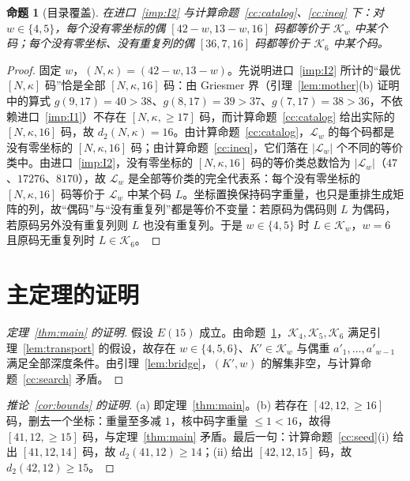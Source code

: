 \documentclass[11pt]{ctexart}
\newtheorem{proposition}{命题}
\theoremstyle{definition}
\begin{document}
\begin{proposition}[目录覆盖]\label{prop:cover}
在进口~\ref{imp:I2} 与计算命题~\ref{cc:catalog}、\ref{cc:ineq} 下：对 $w\in\{4,5\}$，每个没有零坐标的偶 $[42-w,13-w,16]$ 码都等价于 $\mathcal K_w$ 中某个码；每个没有零坐标、没有重复列的偶 $[36,7,16]$ 码都等价于 $\mathcal K_6$ 中某个码。
\end{proposition}
\begin{proof}
固定 $w$，$(N,\kappa)=(42-w,13-w)$。先说明进口~\ref{imp:I2} 所计的“最优 $[N,\kappa]$ 码”恰是全部 $[N,\kappa,16]$ 码：由 Griesmer 界（引理~\ref{lem:mother}(b) 证明中的算式 $g(9,17)=40>38$、$g(8,17)=39>37$、$g(7,17)=38>36$，不依赖进口~\ref{imp:I1}）不存在 $[N,\kappa,\ge17]$ 码，而计算命题~\ref{cc:catalog} 给出实际的 $[N,\kappa,16]$ 码，故 $d_2(N,\kappa)=16$。由计算命题~\ref{cc:catalog}，$\mathcal L_w$ 的每个码都是没有零坐标的 $[N,\kappa,16]$ 码；由计算命题~\ref{cc:ineq}，它们落在 $|\mathcal L_w|$ 个不同的等价类中。由进口~\ref{imp:I2}，没有零坐标的 $[N,\kappa,16]$ 码的等价类总数恰为 $|\mathcal L_w|$（$47$、$17276$、$8170$），故 $\mathcal L_w$ 是全部等价类的完全代表系：每个没有零坐标的 $[N,\kappa,16]$ 码等价于 $\mathcal L_w$ 中某个码 $L$。坐标置换保持码字重量，也只是重排生成矩阵的列，故“偶码”与“没有重复列”都是等价不变量：若原码为偶码则 $L$ 为偶码，若原码另外没有重复列则 $L$ 也没有重复列。于是 $w\in\{4,5\}$ 时 $L\in\mathcal K_w$，$w=6$ 且原码无重复列时 $L\in\mathcal K_6$。
\end{proof}

\section{主定理的证明}

\begin{proof}[定理~\ref{thm:main} 的证明]
假设 $E(15)$ 成立。由命题~\ref{prop:cover}，$\mathcal K_4,\mathcal K_5,\mathcal K_6$ 满足引理~\ref{lem:transport} 的假设，故存在 $w\in\{4,5,6\}$、$K'\in\mathcal K_w$ 与偶重 $a'_1,\dots,a'_{w-1}$ 满足全部深度条件。由引理~\ref{lem:bridge}，$(K',w)$ 的解集非空，与计算命题~\ref{cc:search} 矛盾。
\end{proof}

\begin{proof}[推论~\ref{cor:bounds} 的证明]
(a) 即定理~\ref{thm:main}。(b) 若存在 $[42,12,\ge16]$ 码，删去一个坐标：重量至多减 $1$，核中码字重量 $\le1<16$，故得 $[41,12,\ge15]$ 码，与定理~\ref{thm:main} 矛盾。最后一句：计算命题~\ref{cc:seed}(i) 给出 $[41,12,14]$ 码，故 $d_2(41,12)\ge14$；(ii) 给出 $[42,12,15]$ 码，故 $d_2(42,12)\ge15$。
\end{proof}
\end{document}
